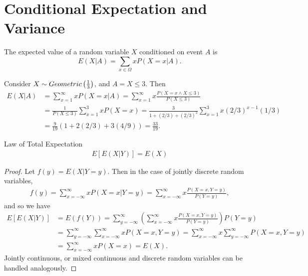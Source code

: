 \section{Conditional Expectation and Variance}

\begin{defn}
    The expected value of a random variable $X$ conditioned on event $A$ is
    \[E(X|A) = \sum_{x \in \Omega}xP(X = x|A).\]
\end{defn}

\begin{exmp}
    Consider $X \sim Geometric\left(\frac{1}{3}\right)$, and $A = X \leq 3$. Then
    \begin{align*}
        E(X|A) &= \sum_{x = 1}^{\infty}xP(X = x|A) = \sum_{x = 1}^{\infty}x\frac{P(X = x \land X \leq 3)}{P(X \leq 3)} \\
        &= \frac{1}{P(X \leq 3)}\sum_{x = 1}^{3}xP(X = x) = \frac{3}{1 + (2/3) + (2/3)^2}\sum_{x = 1}^{3}x(2/3)^{x-1}(1/3) \\
        &= \frac{9}{19}\left(1 + 2(2/3) + 3(4/9)\right) = \frac{33}{19}.
    \end{align*}
\end{exmp}

\begin{thm}{Law of Total Expectation}\label{total-expectation-law}
    \begin{align*}
        E\left[E(X|Y)\right] = E(X)
    \end{align*}
\end{thm}

\begin{proof}
    Let $f(y) = E(X|Y=y)$. Then in the case of jointly discrete random variables,
    \begin{align*}
        f(y) = \sum_{x=-\infty}^{\infty}xP(X=x|Y=y) = \sum_{x=-\infty}^{\infty}x\frac{P(X=x,Y=y)}{P(Y=y)},
    \end{align*}
    and so we have
    \begin{align*}
        E\left[E(X|Y)\right] &= E(f(Y)) = \sum_{y=-\infty}^{\infty}\left(\sum_{x=-\infty}^{\infty}x\frac{P(X=x,Y=y)}{P(Y=y)}\right)P(Y=y) \\
        &= \sum_{y=-\infty}^{\infty}\sum_{x=-\infty}^{\infty}xP(X=x,Y=y) = \sum_{x=-\infty}^{\infty}x\sum_{y=-\infty}^{\infty}P(X=x,Y=y) \\
        &= \sum_{x=-\infty}^{\infty}xP(X=x) = E(X).
    \end{align*}
    Jointly continuous, or mixed continuous and discrete random variables can be handled analogously.
\end{proof}

